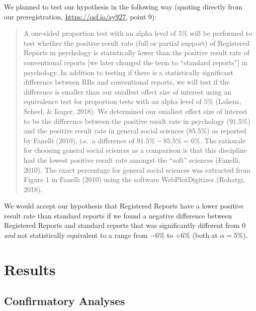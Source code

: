 \documentclass[british,,jou,floatsintext]{apa6}
\begin{document}
We planned to test our hypothesis in the following way (quoting directly from our preregistration, \url{https://osf.io/sy927}, point 9):

\begin{quote}
A one-sided proportion test with an alpha level of \(5\%\) will be performed to test whether the positive result rate (full or partial support) of Registered Reports in psychology is statistically lower than the positive result rate of conventional reports {[}we later changed the term to \enquote{standard reports}{]} in psychology.
In addition to testing if there is a statistically significant difference between RRs and conventional reports, we will test if the difference is smaller than our smallest effect size of interest using an equivalence test for proportion tests with an alpha level of \(5\%\) (Lakens, Scheel, \& Isager, 2018).
We determined our smallest effect size of interest to be the difference between the positive result rate in psychology (\(91.5\%\)) and the positive result rate in general social sciences (\(85.5\%\)) as reported by Fanelli (2010), i.e.~a difference of \(91.5\% - 85.5\% = 6\%\).
The rationale for choosing general social sciences as a comparison is that this discipline had the lowest positive result rate amongst the \enquote{soft} sciences (Fanelli, 2010).
The exact percentage for general social sciences was extracted from Figure 1 in Fanelli (2010) using the software WebPlotDigitizer (Rohatgi, 2018).
\end{quote}

We would accept our hypothesis that Registered Reports have a lower positive result rate than standard reports if we found a negative difference between Registered Reports and standard reports that was significantly different from 0 \emph{and} not statistically equivalent to a range from \(-6\%\) to \(+6\%\) (both at \(\alpha = 5\%\)).

\hypertarget{results}{%
\section{Results}\label{results}}

\hypertarget{confirmatory-analyses}{%
\subsection{Confirmatory Analyses}\label{confirmatory-analyses}}
\end{document}
